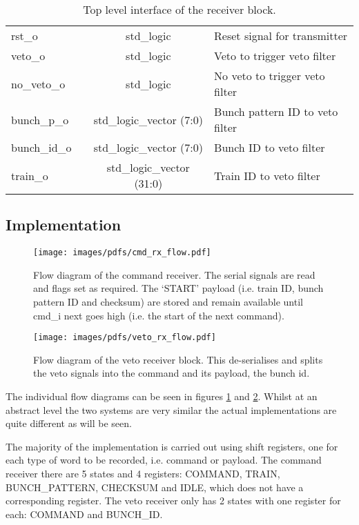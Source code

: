 \documentclass[]{article}
\begin{document}
\begin{table}
\begin{center}
\begin{tabulary}{\textwidth}{l|c|c|L}
				rst\_o       &  & std\_logic                & Reset signal for transmitter    \\
				veto\_o      &  & std\_logic                & Veto to trigger veto filter     \\
				no\_veto\_o  &  & std\_logic                & No veto to trigger veto filter  \\
				bunch\_p\_o  &  & std\_logic\_vector (7:0)  & Bunch pattern ID to veto filter \\
				bunch\_id\_o &  & std\_logic\_vector (7:0)  & Bunch ID to veto filter         \\
				train\_o     &  & std\_logic\_vector (31:0) & Train ID to veto filter         \\
			\end{tabulary}
		\end{center}
		\caption{Top level interface of the receiver block.}
		\label{tab:rx_interface}
	\end{table}
	\subsection{Implementation} %
	\label{sub:rx_implementation}

	\begin{figure}[htbp]
		\centering
		\texttt{[image: images/pdfs/cmd\_rx\_flow.pdf]}
		\caption{Flow diagram of the command receiver. The serial signals are read and flags set as required. The `START' payload (i.e. train ID, bunch pattern ID and checksum) are stored and remain available until cmd\_i next goes high (i.e. the start of the next command).}
		\label{fig:cmd_rx_flow}
	\end{figure}
	\begin{figure}[htbp]
		\centering
		\texttt{[image: images/pdfs/veto\_rx\_flow.pdf]}
		\caption{Flow diagram of the veto receiver block. This de-serialises and splits the veto signals into the command and its payload, the bunch id.}
		\label{fig:veto_rx_flow}
	\end{figure}

	The individual flow diagrams can be seen in figures \ref{fig:cmd_rx_flow} and \ref{fig:veto_rx_flow}. Whilst at an abstract level the two systems are very similar the actual implementations are quite different as will be seen.
	
	The majority of the implementation is carried out using shift registers, one for each type of word to be recorded, i.e. command or payload. The command receiver there are 5 states and 4 registers: COMMAND, TRAIN, BUNCH\_PATTERN, CHECKSUM and IDLE, which does not have a corresponding register. The veto receiver only has 2 states with one register for each: COMMAND and BUNCH\_ID. 
	
\end{document}
